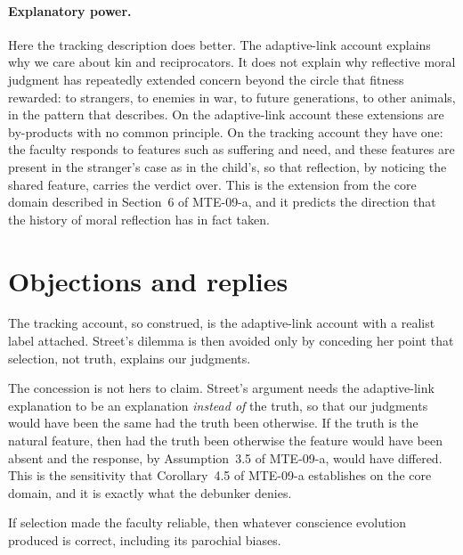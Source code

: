 \documentclass{situationist-preprint}
\begin{document}
\paragraph{Explanatory power.} Here the tracking description does better. The adaptive-link account explains why we care about kin and reciprocators. It does not explain why reflective moral judgment has repeatedly extended concern beyond the circle that fitness rewarded: to strangers, to enemies in war, to future generations, to other animals, in the pattern that \citet{Singer1981} describes. On the adaptive-link account these extensions are by-products with no common principle. On the tracking account they have one: the faculty responds to features such as suffering and need, and these features are present in the stranger's case as in the child's, so that reflection, by noticing the shared feature, carries the verdict over. This is the extension from the core domain described in Section~6 of MTE-09-a, and it predicts the direction that the history of moral reflection has in fact taken.

\section{Objections and replies}

\begin{objection}
The tracking account, so construed, is the adaptive-link account with a realist label attached. Street's dilemma is then avoided only by conceding her point that selection, not truth, explains our judgments.
\end{objection}

\begin{reply}
The concession is not hers to claim. Street's argument needs the adaptive-link explanation to be an explanation \emph{instead of} the truth, so that our judgments would have been the same had the truth been otherwise. If the truth is the natural feature, then had the truth been otherwise the feature would have been absent and the response, by Assumption~3.5 of MTE-09-a, would have differed. This is the sensitivity that Corollary~4.5 of MTE-09-a establishes on the core domain, and it is exactly what the debunker denies.
\end{reply}

\begin{objection}
If selection made the faculty reliable, then whatever conscience evolution produced is correct, including its parochial biases.
\end{objection}
\end{document}
